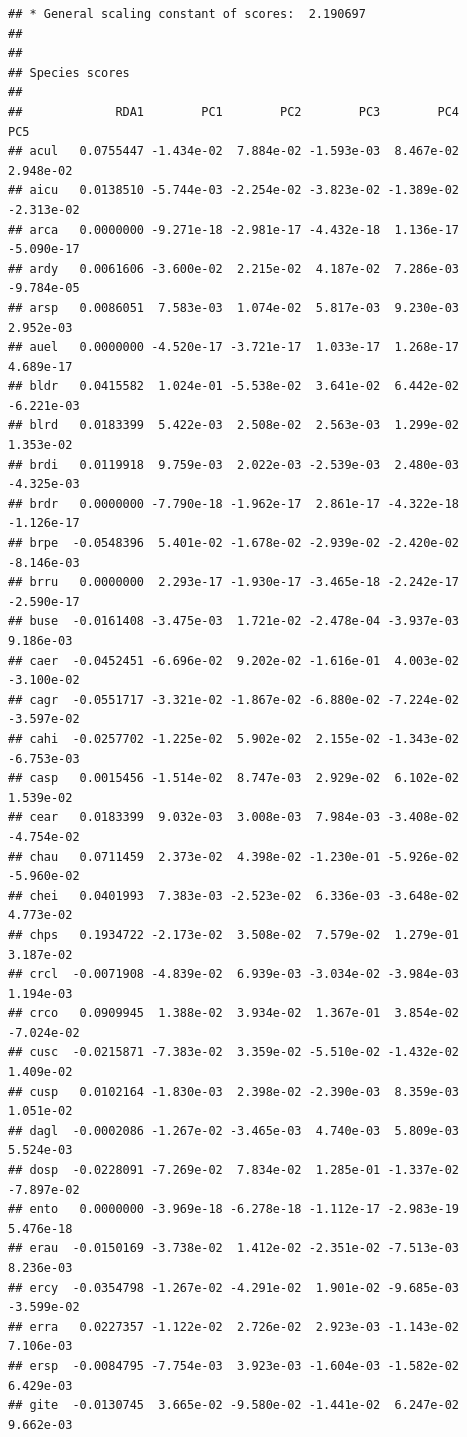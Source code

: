 \documentclass[
]{article}
\begin{document}
\begin{verbatim}
## * General scaling constant of scores:  2.190697 
## 
## 
## Species scores
## 
##             RDA1        PC1        PC2        PC3        PC4        PC5
## acul   0.0755447 -1.434e-02  7.884e-02 -1.593e-03  8.467e-02  2.948e-02
## aicu   0.0138510 -5.744e-03 -2.254e-02 -3.823e-02 -1.389e-02 -2.313e-02
## arca   0.0000000 -9.271e-18 -2.981e-17 -4.432e-18  1.136e-17 -5.090e-17
## ardy   0.0061606 -3.600e-02  2.215e-02  4.187e-02  7.286e-03 -9.784e-05
## arsp   0.0086051  7.583e-03  1.074e-02  5.817e-03  9.230e-03  2.952e-03
## auel   0.0000000 -4.520e-17 -3.721e-17  1.033e-17  1.268e-17  4.689e-17
## bldr   0.0415582  1.024e-01 -5.538e-02  3.641e-02  6.442e-02 -6.221e-03
## blrd   0.0183399  5.422e-03  2.508e-02  2.563e-03  1.299e-02  1.353e-02
## brdi   0.0119918  9.759e-03  2.022e-03 -2.539e-03  2.480e-03 -4.325e-03
## brdr   0.0000000 -7.790e-18 -1.962e-17  2.861e-17 -4.322e-18 -1.126e-17
## brpe  -0.0548396  5.401e-02 -1.678e-02 -2.939e-02 -2.420e-02 -8.146e-03
## brru   0.0000000  2.293e-17 -1.930e-17 -3.465e-18 -2.242e-17 -2.590e-17
## buse  -0.0161408 -3.475e-03  1.721e-02 -2.478e-04 -3.937e-03  9.186e-03
## caer  -0.0452451 -6.696e-02  9.202e-02 -1.616e-01  4.003e-02 -3.100e-02
## cagr  -0.0551717 -3.321e-02 -1.867e-02 -6.880e-02 -7.224e-02 -3.597e-02
## cahi  -0.0257702 -1.225e-02  5.902e-02  2.155e-02 -1.343e-02 -6.753e-03
## casp   0.0015456 -1.514e-02  8.747e-03  2.929e-02  6.102e-02  1.539e-02
## cear   0.0183399  9.032e-03  3.008e-03  7.984e-03 -3.408e-02 -4.754e-02
## chau   0.0711459  2.373e-02  4.398e-02 -1.230e-01 -5.926e-02 -5.960e-02
## chei   0.0401993  7.383e-03 -2.523e-02  6.336e-03 -3.648e-02  4.773e-02
## chps   0.1934722 -2.173e-02  3.508e-02  7.579e-02  1.279e-01  3.187e-02
## crcl  -0.0071908 -4.839e-02  6.939e-03 -3.034e-02 -3.984e-03  1.194e-03
## crco   0.0909945  1.388e-02  3.934e-02  1.367e-01  3.854e-02 -7.024e-02
## cusc  -0.0215871 -7.383e-02  3.359e-02 -5.510e-02 -1.432e-02  1.409e-02
## cusp   0.0102164 -1.830e-03  2.398e-02 -2.390e-03  8.359e-03  1.051e-02
## dagl  -0.0002086 -1.267e-02 -3.465e-03  4.740e-03  5.809e-03  5.524e-03
## dosp  -0.0228091 -7.269e-02  7.834e-02  1.285e-01 -1.337e-02 -7.897e-02
## ento   0.0000000 -3.969e-18 -6.278e-18 -1.112e-17 -2.983e-19  5.476e-18
## erau  -0.0150169 -3.738e-02  1.412e-02 -2.351e-02 -7.513e-03  8.236e-03
## ercy  -0.0354798 -1.267e-02 -4.291e-02  1.901e-02 -9.685e-03 -3.599e-02
## erra   0.0227357 -1.122e-02  2.726e-02  2.923e-03 -1.143e-02  7.106e-03
## ersp  -0.0084795 -7.754e-03  3.923e-03 -1.604e-03 -1.582e-02  6.429e-03
## gite  -0.0130745  3.665e-02 -9.580e-02 -1.441e-02  6.247e-02  9.662e-03

\end{verbatim}
\end{document}
